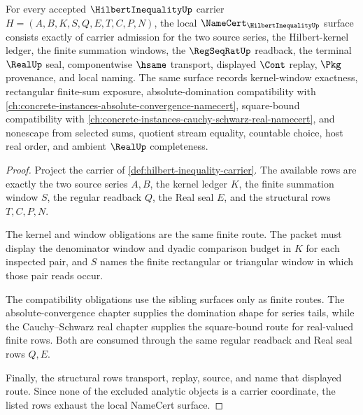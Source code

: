 \begin{theorem}
\label{thm:hilbert-inequality-namecert-obligations}
For every accepted $\HilbertInequalityUp$ carrier $H=(A,B,K,S,Q,E,T,C,P,N)$, the local $\NameCert_{\HilbertInequalityUp}$ surface consists exactly of carrier admission for the two source series, the Hilbert-kernel ledger, the finite summation windows, the $\RegSeqRatUp$ readback, the terminal $\RealUp$ seal, componentwise $\hsame$ transport, displayed $\Cont$ replay, $\Pkg$ provenance, and local naming. The same surface records kernel-window exactness, rectangular finite-sum exposure, absolute-domination compatibility with \autoref{ch:concrete-instances-absolute-convergence-namecert}, square-bound compatibility with \autoref{ch:concrete-instances-cauchy-schwarz-real-namecert}, and nonescape from selected sums, quotient stream equality, countable choice, host real order, and ambient $\RealUp$ completeness.
\end{theorem}
\begin{proof}
Project the carrier of \autoref{def:hilbert-inequality-carrier}. The available rows are exactly the two source series $A,B$, the kernel ledger $K$, the finite summation window $S$, the regular readback $Q$, the Real seal $E$, and the structural rows $T,C,P,N$.

The kernel and window obligations are the same finite route. The packet must display the denominator window and dyadic comparison budget in $K$ for each inspected pair, and $S$ names the finite rectangular or triangular window in which those pair reads occur.

The compatibility obligations use the sibling surfaces only as finite routes. The absolute-convergence chapter supplies the domination shape for series tails, while the Cauchy--Schwarz real chapter supplies the square-bound route for real-valued finite rows. Both are consumed through the same regular readback and Real seal rows $Q,E$.

Finally, the structural rows transport, replay, source, and name that displayed route. Since none of the excluded analytic objects is a carrier coordinate, the listed rows exhaust the local NameCert surface.
\end{proof}

